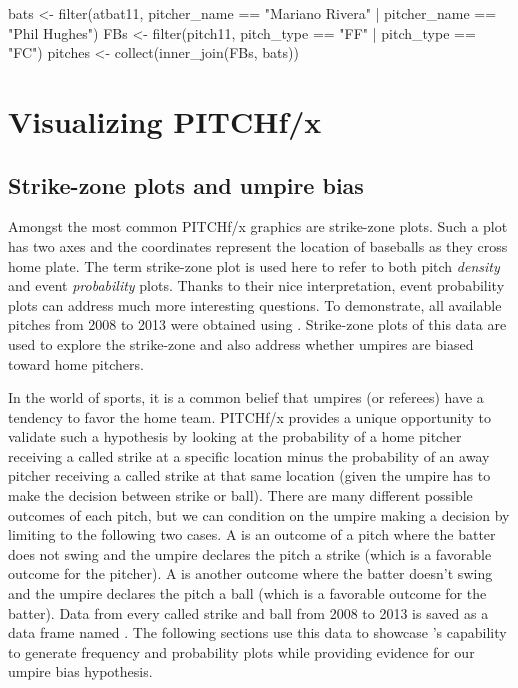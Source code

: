 \begin{article}
\begin{Schunk}
\begin{Sinput}
bats <- filter(atbat11, pitcher_name == "Mariano Rivera" | pitcher_name == "Phil Hughes")
FBs <- filter(pitch11, pitch_type == "FF" | pitch_type == "FC")
pitches <- collect(inner_join(FBs, bats))
\end{Sinput}
\end{Schunk}



\section{Visualizing PITCHf/x}


\subsection{Strike-zone plots and umpire bias}

Amongst the most common PITCHf/x graphics are strike-zone plots. Such
a plot has two axes and the coordinates represent the location of
baseballs as they cross home plate. The term strike-zone plot is used
here to refer to both pitch \emph{density} and event \emph{probability}
plots. Thanks to their nice interpretation, event probability plots
can address much more interesting questions. To demonstrate, all available
pitches from 2008 to 2013 were obtained using . Strike-zone
plots of this data are used to explore the strike-zone and also address
whether umpires are biased toward home pitchers.

In the world of sports, it is a common belief that umpires (or referees)
have a tendency to favor the home team. PITCHf/x provides a unique
opportunity to validate such a hypothesis by looking at the probability
of a home pitcher receiving a called strike at a specific location
minus the probability of an away pitcher receiving a called strike
at that same location (given the umpire has to make the decision between
strike or ball). There are many different possible outcomes of each
pitch, but we can condition on the umpire making a decision by limiting
to the following two cases. A  is an outcome of
a pitch where the batter does not swing and the umpire declares the
pitch a strike (which is a favorable outcome for the pitcher). A 
is another outcome where the batter doesn't swing and the umpire declares
the pitch a ball (which is a favorable outcome for the batter). Data
from every called strike and ball from 2008 to 2013 is saved as a
data frame named . The following sections use this
data to showcase 's capability to generate frequency
and probability plots while providing evidence for our umpire bias
hypothesis.



\end{article}
